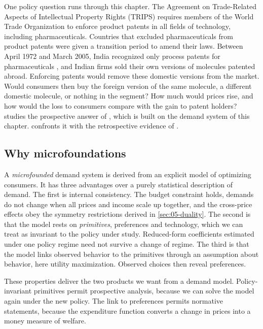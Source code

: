 One policy question runs through this chapter. The Agreement on Trade-Related Aspects of Intellectual
Property Rights (TRIPS) requires members of the World Trade Organization to enforce product patents in all
fields of technology, including pharmaceuticals. Countries that excluded pharmaceuticals from product patents
were given a transition period to amend their laws. Between April 1972 and March 2005, India recognized only
process patents for pharmaceuticals \citep{ChaudhuriGoldbergJia2006}, and Indian firms sold their own
versions of molecules patented abroad. Enforcing patents would remove
these domestic versions from the market. Would consumers then buy the foreign version of the same molecule,
a different domestic molecule, or nothing in the segment? How much would prices rise, and how would the loss
to consumers compare with the gain to patent holders?  studies the prospective answer of
\citet{ChaudhuriGoldbergJia2006}, which is built on the demand system of this chapter. 
confronts it with the retrospective evidence of \citet{DugganGarthwaiteGoyal2016}.

\subsection{Why microfoundations}\label{sec:05-microfoundations}

A \emph{microfounded} demand system is derived from an explicit model of optimizing consumers. It has three
advantages over a purely statistical description of demand. The first is internal consistency. The budget
constraint holds, demands do not change when all prices and income scale up together, and the cross-price
effects obey the symmetry restrictions derived in \cref{sec:05-duality}. The second is that the model rests
on \emph{primitives}, preferences and technology, which we can treat as invariant to the policy under study.
Reduced-form coefficients estimated under one policy regime need not survive a change of regime. The third
is that the model links observed behavior to the primitives through an assumption about behavior, here
utility maximization. Observed choices then reveal preferences.

These properties deliver the two products we want from a demand model. Policy-invariant primitives permit
prospective analysis, because we can solve the model again under the new policy. The link to preferences
permits normative statements, because the expenditure function converts a change in prices into a money
measure of welfare.

